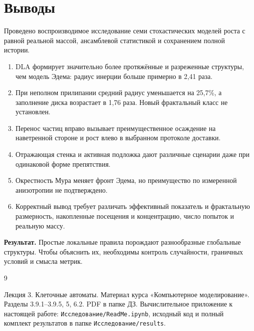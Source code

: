 \documentclass[12pt,a4paper]{article}
\newcommand{\result}[1]{\par\medskip\noindent\textbf{Результат.} #1\par\medskip}
\begin{document}
\section{Выводы}
Проведено воспроизводимое исследование семи стохастических моделей роста
с равной реальной массой, ансамблевой статистикой и сохранением полной истории.
\begin{enumerate}[nosep]
\item DLA формирует значительно более протяжённые и разреженные структуры,
чем модель Эдема: радиус инерции больше примерно в 2,41 раза.
\item При неполном прилипании средний радиус уменьшается на 25,7\%, а заполнение
диска возрастает в 1,76 раза. Новый фрактальный класс не установлен.
\item Перенос частиц вправо вызывает преимущественное осаждение на наветренной
стороне и рост влево в выбранном протоколе доставки.
\item Отражающая стенка и активная подложка дают различные сценарии даже
при одинаковой форме препятствия.
\item Окрестность Мура меняет фронт Эдема, но преимущество по измеренной
анизотропии не подтверждено.
\item Корректный вывод требует различать эффективный показатель и фрактальную
размерность, накопленные посещения и концентрацию, число попыток и реальную массу.
\end{enumerate}

\result{Простые локальные правила порождают разнообразные глобальные структуры.
Чтобы объяснить их, необходимы контроль случайности, граничных условий и смысла метрик.}

\enlargethispage{\baselineskip}
\begin{thebibliography}{9}
\small
{}
 Лекция 3. Клеточные автоматы. Материал курса «Компьютерное
моделирование». Разделы 3.9.1--3.9.5, 5, 6.2. PDF в папке ДЗ.
 Вычислительное приложение к настоящей работе:
\nolinkurl{Исследование/ReadMe.ipynb}, исходный код и полный комплект
результатов в папке \nolinkurl{Исследование/results}.
\end{thebibliography}
\end{document}
